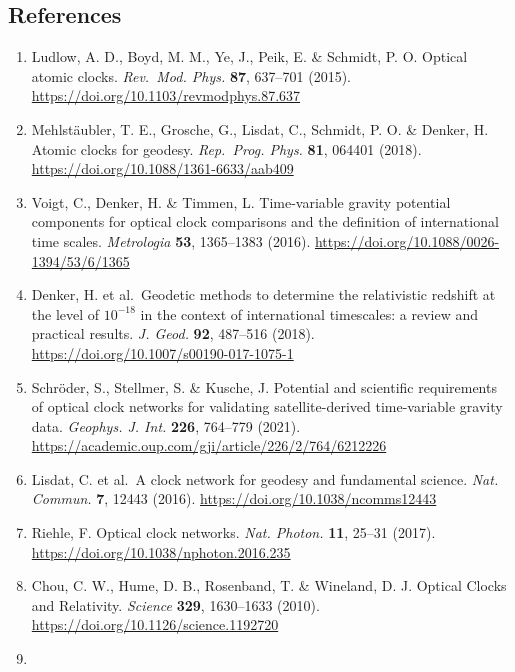 \documentclass[
  10pt,
  a4paper,
]{article}
\providecommand{\tightlist}{%
  \setlength{\itemsep}{0pt}\setlength{\parskip}{0pt}}
\begin{document}
\clearpage

\singlespacing

\hypertarget{references}{%
\subsection{References}\label{references}}

\begin{enumerate}
\def\labelenumi{\arabic{enumi}.}
\tightlist
\item
  Ludlow, A. D., Boyd, M. M., Ye, J., Peik, E. \& Schmidt, P. O. Optical
  atomic clocks. \emph{Rev.~Mod. Phys.} \textbf{87}, 637--701 (2015).
  \url{https://doi.org/10.1103/revmodphys.87.637}
\item
  Mehlstäubler, T. E., Grosche, G., Lisdat, C., Schmidt, P. O. \&
  Denker, H. Atomic clocks for geodesy. \emph{Rep.~Prog. Phys.}
  \textbf{81}, 064401 (2018).
  \url{https://doi.org/10.1088/1361-6633/aab409}
\item
  Voigt, C., Denker, H. \& Timmen, L. Time-variable gravity potential
  components for optical clock comparisons and the definition of
  international time scales. \emph{Metrologia} \textbf{53}, 1365--1383
  (2016). \url{https://doi.org/10.1088/0026-1394/53/6/1365}
\item
  Denker, H. et al.~Geodetic methods to determine the relativistic
  redshift at the level of \(10^{-18}\) in the context of international
  timescales: a review and practical results. \emph{J. Geod.}
  \textbf{92}, 487--516 (2018).
  \url{https://doi.org/10.1007/s00190-017-1075-1}
\item
  Schröder, S., Stellmer, S. \& Kusche, J. Potential and scientific
  requirements of optical clock networks for validating
  satellite-derived time-variable gravity data. \emph{Geophys. J. Int.}
  \textbf{226}, 764--779 (2021).
  \url{https://academic.oup.com/gji/article/226/2/764/6212226}
\item
  Lisdat, C. et al.~A clock network for geodesy and fundamental science.
  \emph{Nat. Commun.} \textbf{7}, 12443 (2016).
  \url{https://doi.org/10.1038/ncomms12443}
\item
  Riehle, F. Optical clock networks. \emph{Nat. Photon.} \textbf{11},
  25--31 (2017). \url{https://doi.org/10.1038/nphoton.2016.235}
\item
  Chou, C. W., Hume, D. B., Rosenband, T. \& Wineland, D. J. Optical
  Clocks and Relativity. \emph{Science} \textbf{329}, 1630--1633 (2010).
  \url{https://doi.org/10.1126/science.1192720}
\item

\end{enumerate}
\end{document}
